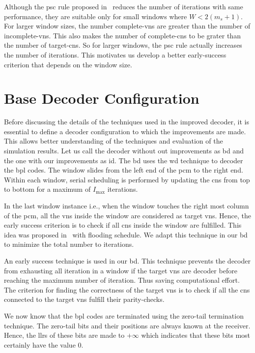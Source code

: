 Although the \ac{psc} rule proposed in~\cite{Kang2018} reduces the number of iterations with same performance, they are suitable only for small windows where $W<2(m_s+1)$. For larger window sizes, the number complete-\acp{vn} are greater than the number of incomplete-\acp{vn}. This also makes the number of complete-\acp{cn} to be grater than the number of target-\acp{cn}. So for larger windows, the \ac{psc} rule actually increases the number of iterations. This motivates us develop a better early-success criterion that depends on the window size.

\section{Base Decoder Configuration}
Before discussing the details of the techniques used in the improved decoder, it is essential to define a decoder configuration to which the improvements are made. This allows better understanding of the techniques and evaluation of the simulation results. Let us call the decoder without out improvements as \ac{bd} and the one with our improvements as \ac{id}. The \ac{bd} uses the \ac{wd} technique to decoder the \ac{bpl} codes. The window slides from the left end of the \ac{pcm} to the right end. Within each window, serial scheduling is performed by updating the \acp{cn} from top to bottom for a maximum of $I_{\text{max}}$ iterations.

In the last window instance i.e., when the window touches the right most column of the \ac{pcm}, all the \acp{vn} inside the window are considered as target \acp{vn}. Hence, the early success criterion is to check if all \acp{cn} inside the window are fulfilled. This idea was proposed in~\cite{Ali2018} with flooding schedule. We adapt this technique in our \ac{bd} to minimize the total number to iterations.

An early success technique is used in our \ac{bd}. This technique prevents the decoder from exhausting all iteration in a window if the target \acp{vn} are decoder before reaching the maximum number of iteration. Thus saving computational effort. The criterion for finding the correctness of the target \acp{vn} is to check if all the \acp{cn} connected to the target \acp{vn} fulfill their parity-checks.

We now know that the \ac{bpl} codes are terminated using the zero-tail termination technique. The zero-tail bits and their positions are always known at the receiver. Hence, the \acp{llr} of these bits are made to $+\infty$ which indicates that these bits most certainly have the value 0.


